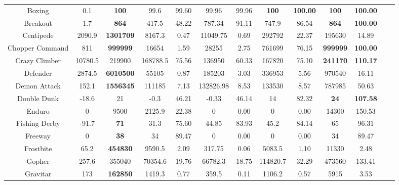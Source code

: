 \documentclass[nohyperref]{article}
\theoremstyle{plain}
\begin{document}
\begin{table}[!hb]
\begin{center}
\begin{tabular}{ |c |c |c| c c| c c|  c c |c c |c c |}
 Boxing             & 0.1       & \textbf{100}                & 99.6     &99.60   & 99.96      & 99.96      & \textbf{100}     & \textbf{100.00}    &\textbf{100}       &\textbf{100.00}    \\
 Breakout           & 1.7       & \textbf{864}                & 417.5    &48.22   & 787.34     & 91.11      & 747.9   & 86.54      &\textbf{864}     &\textbf{100.00}   \\
 Centipede          & 2090.9    & \textbf{1301709}   & 8167.3   &0.47    & 11049.75   & 0.69       & 292792  & 22.37              &195630    &14.89\\
 Chopper Command    & 811       & \textbf{999999}             & 16654    &1.59    & 28255      & 2.75       & 761699  & 76.15     &\textbf{999999}    &\textbf{100.00}\\
 Crazy Climber      & 10780.5   & 219900    & 168788.5 &75.56   & 136950     & 60.33      & 167820  & 75.10                      &\textbf{241170}    &\textbf{110.17}\\
 Defender           & 2874.5    & \textbf{6010500}   & 55105    &0.87    & 185203     & 3.03       & 336953  & 5.56                  &970540    &16.11\\
 Demon Attack       & 152.1     & \textbf{1556345}   & 111185   &7.13    & 132826.98  & 8.53       & 133530  & 8.57                       &787985   &50.63\\
 Double Dunk        & -18.6     & 21                 & -0.3     &46.21   & -0.33      & 46.14      & 14      & 82.32      &\textbf{24}        &\textbf{107.58}\\
 Enduro             & 0         & 9500               & 2125.9   &22.38   & 0          & 0.00       & 0       & 0.00      &14300     &150.53\\
 Fishing Derby      & -91.7     & \textbf{71}        & 31.3     &75.60   & 44.85      & 83.93      & 45.2    & 84.14             &65        &96.31\\
 Freeway            & 0         & \textbf{38}        & 34       &89.47   & 0          & 0.00       & 0       & 0.00           &34        &89.47\\
 Frostbite          & 65.2      & \textbf{454830}    & 9590.5   &2.09    & 317.75     & 0.06       & 5083.5  & 1.10                      &11330     &2.48\\          
 Gopher             & 257.6     & 355040             & 70354.6  &19.76   & 66782.3    & 18.75      & 114820.7& 32.29     &473560    &133.41\\
 Gravitar           & 173       & \textbf{162850}    & 1419.3   &0.77    & 359.5      & 0.11       & 1106.2  & 0.57                      &5915      &3.53\\

\end{tabular}
\end{center}
\end{table}
\end{document}
